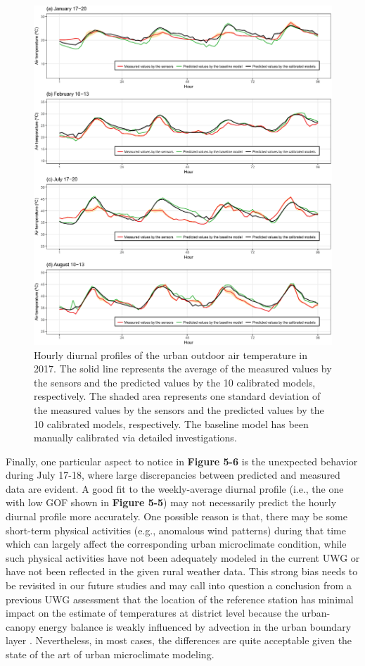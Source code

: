 \begin{figure}[!h]
\centering
\includegraphics[width=.95\linewidth]{Figure5-6.eps}
\caption{Hourly diurnal profiles of the urban outdoor air temperature in 2017. The solid line represents the average of the measured values by the sensors and the predicted values by the 10 calibrated models, respectively. The shaded area represents one standard deviation of the measured values by the sensors and the predicted values by the 10 calibrated models, respectively. The baseline model has been manually calibrated via detailed investigations.}
\end{figure}

Finally, one particular aspect to notice in \textbf{Figure 5-6} is the unexpected behavior during July 17-18, where large discrepancies between predicted and measured data are evident. A good fit to the weekly-average diurnal profile (i.e., the one with low GOF shown in \textbf{Figure 5-5}) may not necessarily predict the hourly diurnal profile more accurately. One possible reason is that, there may be some short-term physical activities (e.g., anomalous wind patterns) during that time which can largely affect the corresponding urban microclimate condition, while such physical activities have not been adequately modeled in the current UWG or have not been reflected in the given rural weather data. This strong bias needs to be revisited in our future studies and may call into question a conclusion from a previous UWG assessment that the location of the reference station has minimal impact on the estimate of temperatures at district level because the urban-canopy energy balance is weakly influenced by advection in the urban boundary layer \cite{bueno2014computationally}. Nevertheless, in most cases, the differences are quite acceptable given the state of the art of urban microclimate modeling.



